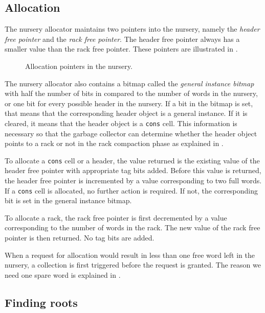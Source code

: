 \subsection{Allocation}

The nursery allocator maintains two pointers into the nursery, namely
the \emph{header free pointer} and the \emph{rack free pointer}.  The
header free pointer always has a smaller value than the rack free
pointer.  These pointers are illustrated in
.

\begin{figure}
\begin{center}
\end{center}
\caption{\label{fig-nursery-pointers}
Allocation pointers in the nursery.}
\end{figure}

The nursery allocator also contains a bitmap called the \emph{general
  instance bitmap} with half the number of bits in compared to the
number of words in the nursery, or one bit for every possible header
in the nursery.  If a bit in the bitmap is set, that means that the
corresponding header object is a general instance.  If it is cleared,
it means that the header object is a \texttt{cons} cell.  This
information is necessary so that the garbage collector can determine
whether the header object points to a rack or not in the rack
compaction phase as explained in
.

To allocate a \texttt{cons} cell or a header, the value returned is
the existing value of the header free pointer with appropriate tag
bits added.  Before this value is returned, the header free pointer is
incremented by a value corresponding to two full words.  If a
\texttt{cons} cell is allocated, no further action is required.  If
not, the corresponding bit is set in the general instance bitmap.

To allocate a rack, the rack free pointer is first decremented by a
value corresponding to the number of words in the rack.  The new value
of the rack free pointer is then returned.  No tag bits are added.

When a request for allocation would result in less than one free word
left in the nursery, a collection is first triggered before the
request is granted.  The reason we need one spare word is explained in
.

\subsection{Finding roots}

